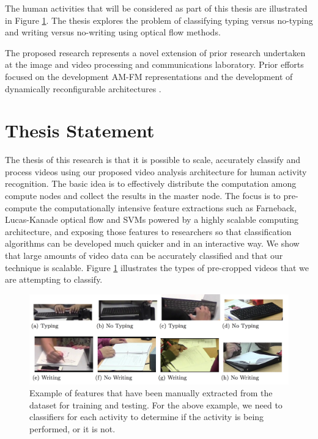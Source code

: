 The human activities that will be considered as part of this thesis are
illustrated in Figure \ref{fig:typing_writing}. The thesis explores the problem
of classifying typing versus no-typing and writing versus no-writing using
optical flow methods.

The proposed research represents a novel extension of prior research undertaken
at the image and video processing and communications laboratory. Prior efforts
focused on the development AM-FM representations \cite{5378645} \cite{Cesar2012}
\cite{6693707} \cite{loizou2014despeckle} \cite{agurto2011automatic}
\cite{5590295} \cite{5414522} \cite{5405648} \cite{murray2012} \cite{4135672}
\cite{908521} \cite{765139} \cite{janakiramanan2011tree} \cite{985561}
\cite{931092} \cite{923291} \cite{758405} and the development of dynamically
reconfigurable architectures \cite{Carranza2016} \cite{llamocca2014dynamic}
\cite{7418203} \cite{7015949} \cite{jiang2014dynamically} \cite{6806021}
\cite{6810466}.



\section{\label{section:thesis_statement}Thesis Statement} The thesis of this
research is that it is possible to scale, accurately classify and process videos
using our proposed video analysis architecture for human activity recognition.
The basic idea is to effectively distribute the computation among compute nodes
and collect the results in the master node. The focus is to pre-compute the
computationally intensive feature extractions such as Farneback, Lucas-Kanade
optical flow and SVMs powered by a highly scalable computing architecture, and
exposing those features to researchers so that classification algorithms can  be
developed much quicker and in an interactive way. We show that large amounts of
video data can be accurately classified and that our technique is scalable.
Figure \ref{fig:typing_writing} illustrates the types of pre-cropped videos that
we are attempting to classify.

\begin{figure}[h]
  \label{fig:typing_writing}
  \centering
  \includegraphics[width=\textwidth]{figures/typing_writing_clip}
  \caption{Example of features that have been manually extracted from the dataset
  for training and testing. For the above example, we need to classifiers for each
  activity to determine if the activity is being performed, or it is not.}
\end{figure}

